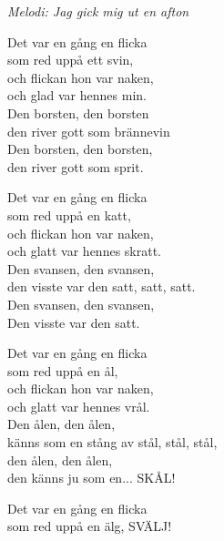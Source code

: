 {\footnotesize\textit{Melodi: Jag gick mig ut en afton}}\par
\vspace{10pt}
Det var en gång en flicka \\
som red uppå ett svin, \\
och flickan hon var naken,\\ 
och glad var hennes min. \\
Den borsten, den borsten \\
den river gott som brännevin \\
Den borsten, den borsten, \\
den river gott som sprit.\par
\vspace{8pt}
Det var en gång en flicka \\
som red uppå en katt, \\
och flickan hon var naken,\\ 
och glatt var hennes skratt.\\ 
Den svansen, den svansen, \\
den visste var den satt, satt, satt.\\ 
Den svansen, den svansen, \\
Den visste var den satt.\par
\vspace{8pt}
Det var en gång en flicka \\
som red uppå en ål, \\
och flickan hon var naken,\\ 
och glatt var hennes vrål. \\
Den ålen, den ålen, \\
känns som en stång av stål, stål, stål,\\ 
den ålen, den ålen, \\
den känns ju som en... SKÅL!\par
\vspace{8pt}
Det var en gång en flicka \\
som red uppå en älg, SVÄLJ!
